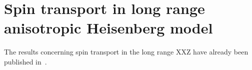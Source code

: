 \chapter{Spin transport in long range anisotropic Heisenberg model\label{chap:spin_transport}}
\thispagestyle{chapterBeginStyle}

The results concerning spin transport in the long range XXZ have already been published in~\textcite{Mierzejewski2023}.
